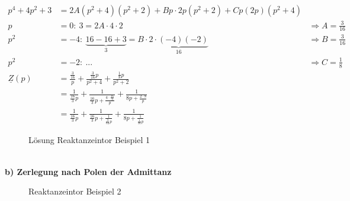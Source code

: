 \begin{align}
p^4+4p^2+3&=2A(p^2+4)(p^2+2)+Bp\cdot 2p(p^2+2)+Cp(2p)(p^2+4)\nonumber\\
p&=0:\ 3=2A\cdot 4 \cdot 2 &\Rightarrow A=\frac{3}{16}\nonumber\\
p^2&=-4:\ \underbrace{16-16+3}_{3}=B\cdot \underbrace{2\cdot (-4)(-2)}_{16}
&\Rightarrow B=\frac{3}{16}\nonumber\\ 
p^2&=-2:\ ... &\Rightarrow C=\frac{1}{8}\nonumber\\
\underline{Z}(p)&=\frac{\frac{3}{16}}{p}+\frac{\frac{3}{16}p}{p^2+4}+\frac{\frac{1}{8}p}{p^2+2}\nonumber\\
&=\frac{1}{\frac{16}{3}p}+\frac{1}{\frac{16}{3}p+\frac{4\cdot\frac{16}{3}}{p}}+\frac{1}{8p+\frac{2\cdot8}{p}}\nonumber\\
&=\frac{1}{\frac{16}{3}p}+\frac{1}{\frac{16}{3}p+\frac{1}{\frac{3}{64}p}}+\frac{1}{8p+\frac{1}{\frac{1}{16}p}}\nonumber
\end{align}
\begin{figure}[!h]
	\centering
	
	\caption{Lösung Reaktanzeintor Beispiel 1}
	\label{fig:RetSyntheseBsp1SL}
\end{figure}\\
\textbf{b) Zerlegung nach Polen der Admittanz}\\
\begin{figure}[!h]
	\centering
	
	\caption{Reaktanzeintor Beispiel 2}
	\label{fig:RetSyntheseBsp2}
\end{figure}\\

